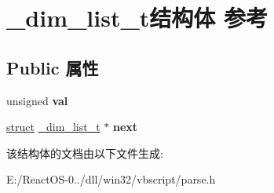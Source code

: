 \hypertarget{struct__dim__list__t}{}\section{\+\_\+dim\+\_\+list\+\_\+t结构体 参考}
\label{struct__dim__list__t}
\subsection*{Public 属性}
\begin{DoxyCompactItemize}
\item 
\mbox{\label{struct__dim__list__t_a69e1357b168e62f96c4dd1870bb23c51}} 
unsigned {\bfseries val}
\item 
\mbox{\label{struct__dim__list__t_a0f317ce2847137e90303d777c1cd5743}} 
\hyperlink{interfacestruct}{struct} \hyperlink{struct__dim__list__t}{\+\_\+dim\+\_\+list\+\_\+t} $\ast$ {\bfseries next}
\end{DoxyCompactItemize}


该结构体的文档由以下文件生成\+:\begin{DoxyCompactItemize}
\item 
E\+:/\+React\+O\+S-\/0../dll/win32/vbscript/parse.\+h\end{DoxyCompactItemize}
